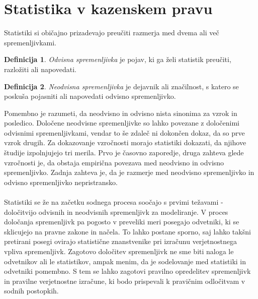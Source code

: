\documentclass[12pt,a4paper]{amsart}
\theoremstyle{definition} %
\newtheorem{definicija}{Definicija}[section]
\theoremstyle{plain} %
\begin{document}
\section{Statistika v kazenskem pravu}
Statistiki si običajno prizadevajo preučiti razmerja med dvema ali več spremenljivkami.
\begin{definicija}
    \textit{Odvisna spremenljivka} je pojav, ki ga želi statistik preučiti, razložiti ali napovedati.
\end{definicija}
\begin{definicija}
    \textit{Neodvisna spremenljivka} je dejavnik ali značilnost, s katero se poskuša pojasniti ali napovedati odvisno spremenljivko.
\end{definicija}
Pomembno je razumeti, da neodvisno in odvisno nista sinonima za vzrok in posledico. Določene neodvisne spremenljivke so lahko povezane z
določenimi odvisnimi spremenljivkami, vendar to še zdaleč ni dokončen dokaz, da so prve vzrok drugih. Za dokazovanje vzročnosti morajo
statistiki dokazati, da njihove študije izpolnjujejo tri merila. Prvo je časovno zaporedje, druga zahteva glede vzročnosti je, da obstaja empirična povezava med neodvisno in odvisno spremenljivko.
Zadnja zahteva je, da je razmerje med neodvisno spremenljivko in odvisno spremenljivko nepristransko.\\\\
Statistiki se že na začetku sodnega procesa soočajo s prvimi težavami - določitvijo odvisnih in neodvisnih spremenljivk za
modeliranje. V proces določanja spremenljivk pa pogosto v preveliki meri posegajo odvetniki, ki se sklicujejo na pravne zakone in načela. To lahko
postane sporno, saj lahko takšni pretirani posegi ovirajo statistične znanstvenike pri izračunu verjetnostnega vpliva spremenljivk. Zagotovo 
določitev spremenljivk ne sme biti naloga le odvetnikov ali le statistikov, ampak menim, da je sodelovanje med statistiki in odvetniki pomembno.  S tem se lahko zagotovi pravilno opredelitev spremenljivk in pravilne verjetnostne 
izračune, ki bodo prispevali k pravičnim odločitvam v sodnih postopkih.

\end{document}
